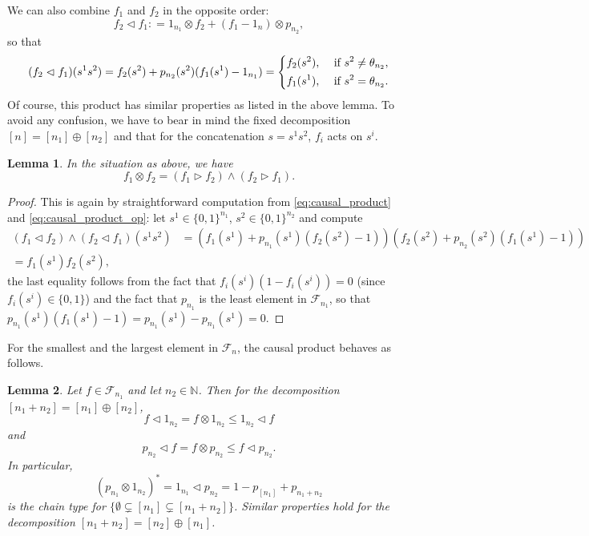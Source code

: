 \documentclass[12pt]{article}
\newtheorem{lemma}{Lemma}
\theoremstyle{definition}
\theoremstyle{remark}
\def\Fe{\mathcal F}
\def\vtl{\vartriangleleft}
\def\vtr{\vartriangleright}
\begin{document}
We can also combine $f_1$ and $f_2$ in the opposite order:
\[
f_2\vtl f_1: =1_{n_1}\otimes f_2+(f_1-1_n)\otimes p_{n_2},
\]
so that
\begin{equation}\label{eq:causal_product_op}
(f_2\vtl f_1)(s^1s^2)=f_2(s^2)+p_{n_2}(s^2)(f_1(s^1)-1_{n_1})=\begin{dcases} f_2(s^2), & \text{ if }
s^2\ne \theta_{n_2},\\
   f_1(s^1), & \text{ if } s^2=\theta_{n_2}.
   \end{dcases}
\end{equation}
Of course, this product has similar properties as listed in the above lemma.
To avoid any confusion, we have to bear in mind the fixed decomposition $[n]=[n_1]\oplus
[n_2]$ and that for the concatenation $s=s^1s^2$, $f_i$ acts on $s^i$. 

\begin{lemma}\label{lemma:causal_tensor} In the situation as above, we have
\[
f_1\otimes f_2 = (f_1\vtr f_2)\wedge (f_2\vtr f_1).
\]

\end{lemma}


\begin{proof} This is again by straightforward computation from \eqref{eq:causal_product}
and \eqref{eq:causal_product_op}: let
$s^1\in \{0,1\}^{n_1}$, $s^2\in \{0,1\}^{n_2}$ and compute
\begin{align*}
(f_1\vtl f_2)\wedge (f_2\vtl
f_1)(s^1s^2)&=\left(f_1(s^1)+p_{n_1}(s^1)(f_2(s^2)-1)\right)\left(f_2(s^2)+p_{n_2}(s^2)(f_1(s^1)-1)\right)\\
=f_1(s^1)f_2(s^2),
\end{align*}
the last equality follows from the fact that $f_i(s^i)(1-f_i(s^i))=0$ (since $f_i(s^i)\in
\{0,1\}$) and the fact that $p_{n_1}$ is the least element in $\Fe_{n_1}$, so that
$p_{n_1}(s^1)(f_1(s^1)-1)=p_{n_1}(s^1)-p_{n_1}(s^1)=0$. 

\end{proof}

For the smallest and the largest element in $\Fe_n$, the causal product behaves as
follows.
\begin{lemma}\label{lemma:onechain_causal}
Let  $f\in \Fe_{n_1}$ and let $n_2\in \mathbb N$. Then for the decomposition
$[n_1+n_2]=[n_1]\oplus [n_2]$,  
\[
f\vtl 1_{n_2}= f\otimes 1_{n_2}\le 1_{n_2}\vtl f
\]
and
\[
p_{n_2} \vtl f= f \otimes p_{n_2}\le f\vtl p_{n_2}.
\]
In particular,
\[
(p_{n_1}\otimes 1_{n_2})^*=1_{n_1}\vtl p_{n_2}=1-p_{[n_1]}+p_{n_1+n_2}
\]
is the chain type for $\{\emptyset\subsetneq [n_1]\subsetneq [n_1+n_2]\}$. Similar
properties hold for the decomposition $[n_1+n_2]=[n_2]\oplus[n_1]$.
\end{lemma}
\end{document}
